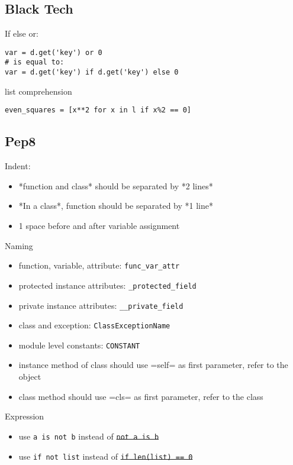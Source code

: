 \subsection{Black Tech}
If else or:
\begin{lstlisting}
var = d.get('key') or 0
# is equal to:
var = d.get('key') if d.get('key') else 0
\end{lstlisting}

list comprehension

\begin{lstlisting}
even_squares = [x**2 for x in l if x%2 == 0]
\end{lstlisting}

\subsection{Pep8}
Indent:
\begin{itemize}
\item *function and class* should be separated by *2 lines*
\item *In a class*, function should be separated by *1 line*
\item 1 space before and after variable assignment
\end{itemize}

Naming
\begin{itemize}
\item function, variable, attribute: \verb$func_var_attr$
\item protected instance attributes: \verb$_protected_field$
\item private instance attributes: \verb$__private_field$
\item class and exception: \verb$ClassExceptionName$
\item module level constants: \verb$CONSTANT$
\item instance method of class should use =self= as first parameter, refer to the object
\item class method should use =cls= as first parameter, refer to the class
\end{itemize}

Expression

\begin{itemize}
\item use \texttt{a is not b} instead of \sout{\texttt{not a is b}}
\item use \texttt{if not list} instead of \sout{\texttt{if len(list) == 0}}
\end{itemize}

